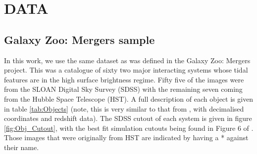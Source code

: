 \vspace{-5mm}
\section{DATA}\label{Data}
\subsection{Galaxy Zoo: Mergers sample}
\noindent In this work, we use the same dataset as was defined in the Galaxy Zoo: Mergers project. This was a catalogue of sixty two major interacting systems whose tidal features are in the high surface brightness regime. Fifty five of the images were from the SLOAN Digital Sky Survey (SDSS) with the remaining seven coming from the Hubble Space Telescope (HST). A full description of each object is given in table \ref{tab:Objects} (note, this is very similar to that from \citet{Holincheck_16}, with decimalised coordinates and redshift data). The SDSS cutout of each system is given in figure \ref{fig:Obj_Cutout}, with the best fit simulation cutouts being found in Figure 6 of \citet{Holincheck_16}. Those images that were originally from HST are indicated by having a * against their name.

